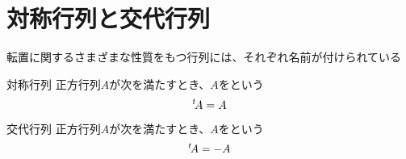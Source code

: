 \documentclass[../../../topic_linear-algebra]{subfiles}
\begin{document}
\sectionline
\section{対称行列と交代行列}

転置に関するさまざまな性質をもつ行列には、それぞれ名前が付けられている

\begin{definition}{対称行列}
  正方行列$A$が次を満たすとき、$A$をという
  \begin{equation*}
    {}^t\! A = A
  \end{equation*}
\end{definition}

\begin{definition}{交代行列}
  正方行列$A$が次を満たすとき、$A$をという
  \begin{equation*}
    {}^t\! A = -A
  \end{equation*}
\end{definition}
\end{document}
